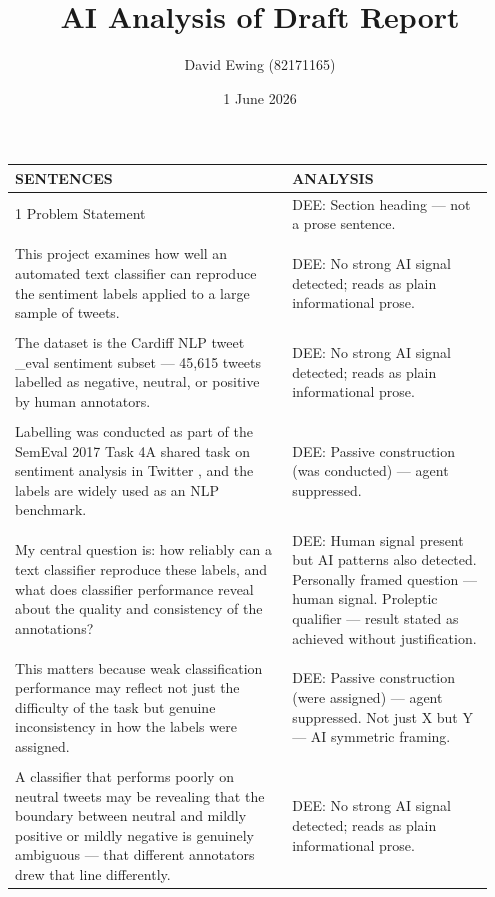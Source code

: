 \documentclass[11pt]{article}
\title{AI Analysis of Draft Report}
\author{David Ewing (82171165)}
\date{1 June 2026}
\begin{document}
\maketitle
\thispagestyle{empty}
\newpage

\setlength{\LTleft}{0pt}
\setlength{\LTright}{0pt}
\begin{longtable}{|p{0.55\linewidth}|p{0.40\linewidth}|}
\hline
\centering\textbf{SENTENCES} & \centering\textbf{ANALYSIS} \tabularnewline[2pt]
\hline
\endhead
1 Problem Statement & DEE: Section heading --- not a prose sentence. \\[2pt]
\hline
\rule{0pt}{3.5cm} & \\
\hline
This project examines how well an automated text classifier can reproduce the sentiment labels applied to a large sample of tweets. & DEE: No strong AI signal detected; reads as plain informational prose. \\[2pt]
\hline
\rule{0pt}{3.5cm} & \\
\hline
The dataset is the Cardiff NLP tweet \_eval sentiment subset --- 45,615 tweets labelled as negative, neutral, or positive by human annotators. & DEE: No strong AI signal detected; reads as plain informational prose. \\[2pt]
\hline
\rule{0pt}{3.5cm} & \\
\hline
Labelling was conducted as part of the SemEval 2017 Task 4A shared task on sentiment analysis in Twitter , and the labels are widely used as an NLP benchmark. & DEE: Passive construction (was conducted) --- agent suppressed. \\[2pt]
\hline
\rule{0pt}{3.5cm} & \\
\hline
My central question is: how reliably can a text classifier reproduce these labels, and what does classifier performance reveal about the quality and consistency of the annotations? & DEE: Human signal present but AI patterns also detected. Personally framed question --- human signal. Proleptic qualifier --- result stated as achieved without justification. \\[2pt]
\hline
\rule{0pt}{3.5cm} & \\
\hline
This matters because weak classification performance may reflect not just the difficulty of the task but genuine inconsistency in how the labels were assigned. & DEE: Passive construction (were assigned) --- agent suppressed. Not just X but Y --- AI symmetric framing. \\[2pt]
\hline
\rule{0pt}{3.5cm} & \\
\hline
A classifier that performs poorly on neutral tweets may be revealing that the boundary between neutral and mildly positive or mildly negative is genuinely ambiguous --- that different annotators drew that line differently. & DEE: No strong AI signal detected; reads as plain informational prose. \\[2pt]

\end{longtable}
\end{document}
